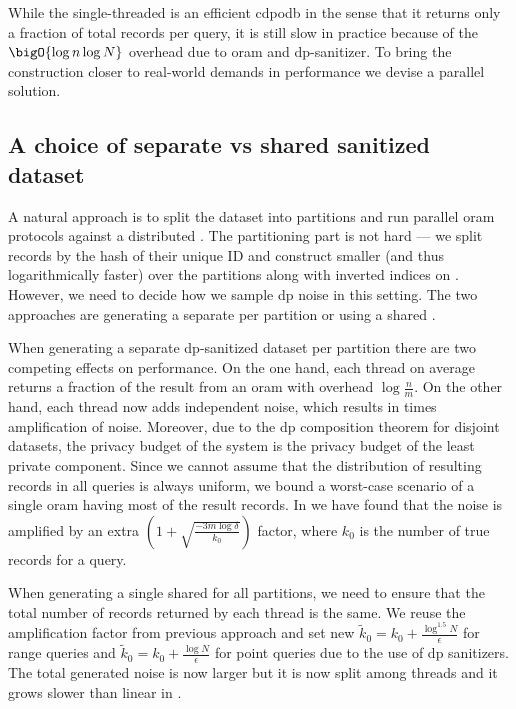 		While the single-threaded \epsolute{} is an efficient \acrshort{cdpodb} in the sense that it returns only a fraction of total records per query, it is still slow in practice because of the $\bigO{\log \dataSize \log \domainSize}$ overhead due to \acrshort{oram} and \acrshort{dp}-sanitizer.
		To bring the construction closer to real-world demands in performance we devise a parallel solution.

		\subsection{A choice of separate vs shared sanitized dataset}

			A natural approach is to split the dataset \database{} into \oramsNumber{} partitions and run parallel \acrshort{oram} protocols against a distributed \server{}.
			The partitioning part is not hard --- we split records by the hash of their unique ID and construct smaller (and thus logarithmically faster)  over the partitions along with \oramsNumber{} inverted indices on \user{}.
			However, we need to decide how we sample \acrshort{dp} noise in this setting.
			The two approaches are generating a separate \serverDS{} per partition or using a shared \serverDS{}.

			When generating a separate \acrshort{dp}-sanitized dataset \serverDS{} per partition there are two competing effects on performance.
			On the one hand, each thread on average returns a  fraction of the result from an \acrshort{oram} with overhead $\log \frac{n}{m}$.
			On the other hand, each thread now adds independent noise, which results in \oramsNumber{} times amplification of noise.
			Moreover, due to the \acrshort{dp} composition theorem \cite{privacy-integrated-queries,differential-privacy-original,our-data-ourselves} for disjoint datasets, the privacy budget of the system is the privacy budget of the least private component.
			Since we cannot assume that the distribution of resulting records in all queries is always uniform, we bound a worst-case scenario of a single \acrshort{oram} having most of the result records.
			In \cite[Section 5.1]{epsolute} we have found that the noise is amplified by an extra $\left( 1 + \sqrt{ \frac{-3 m \log \delta}{k_0} } \right)$ factor, where $k_0$ is the number of true records for a query.

			When generating a single shared \serverDS{} for all \oramsNumber{} partitions, we need to ensure that the total number of records returned by each thread is the same.
			We reuse the amplification factor from previous approach and set new $\tilde{k}_0 = k_0 + \frac{\log^{1.5} N}{\epsilon}$ for range queries and $\tilde{k}_0 = k_0 + \frac{\log N}{\epsilon}$ for point queries due to the use of \acrshort{dp} sanitizers.
			The total generated noise is now larger but it is now split among \oramsNumber{} threads and it grows slower than linear in \oramsNumber{}.

